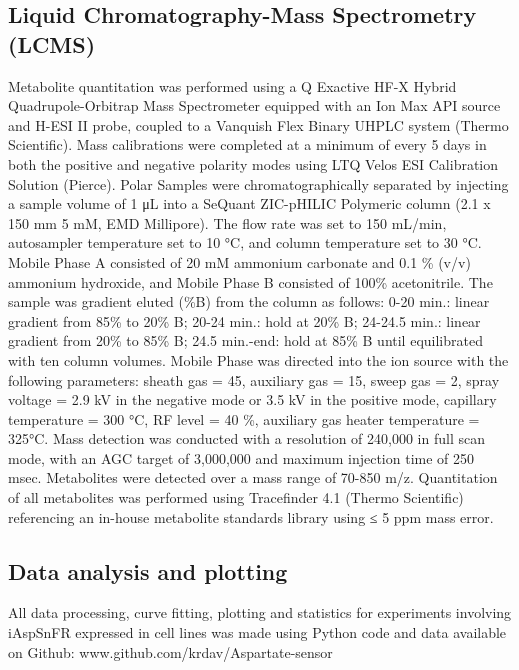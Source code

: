\documentclass[9pt,lineno]{elife}
\begin{document}
\subsection{Liquid Chromatography-Mass Spectrometry (LCMS)}
Metabolite quantitation was performed using a Q Exactive HF-X Hybrid Quadrupole-Orbitrap Mass Spectrometer equipped with an Ion Max API source and H-ESI II probe, coupled to a Vanquish Flex Binary UHPLC system (Thermo Scientific).
Mass calibrations were completed at a minimum of every 5 days in both the positive and negative polarity modes using LTQ Velos ESI Calibration Solution (Pierce).
Polar Samples were chromatographically separated by injecting a sample volume of 1 μL into a SeQuant ZIC-pHILIC Polymeric column (2.1 x 150 mm 5 mM, EMD Millipore).
The flow rate was set to 150 mL/min, autosampler temperature set to 10 °C, and column temperature set to 30 °C.
Mobile Phase A consisted of 20 mM ammonium carbonate and 0.1 \% (v/v) ammonium hydroxide, and Mobile Phase B consisted of 100\% acetonitrile.
The sample was gradient eluted (\%B) from the column as follows: 0-20 min.: linear gradient from 85\% to 20\% B; 20-24 min.: hold at 20\% B; 24-24.5 min.: linear gradient from 20\% to 85\% B; 24.5 min.-end: hold at 85\% B until equilibrated with ten column volumes.
Mobile Phase was directed into the ion source with the following parameters: sheath gas = 45, auxiliary gas = 15, sweep gas = 2, spray voltage = 2.9 kV in the negative mode or 3.5 kV in the positive mode, capillary temperature = 300 °C, RF level = 40 \%, auxiliary gas heater temperature = 325°C.
Mass detection was conducted with a resolution of 240,000 in full scan mode, with an AGC target of 3,000,000 and maximum injection time of 250 msec.
Metabolites were detected over a mass range of 70-850 m/z.
Quantitation of all metabolites was performed using Tracefinder 4.1 (Thermo Scientific) referencing an in-house metabolite standards library using ≤ 5 ppm mass error.

\subsection{Data analysis and plotting}
All data processing, curve fitting, plotting and statistics for experiments involving iAspSnFR expressed in cell lines was made using Python code and data available on Github:
www.github.com/krdav/Aspartate-sensor
\end{document}
